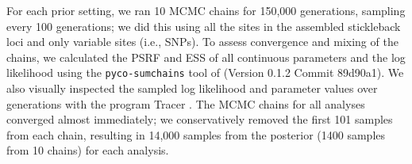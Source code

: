 For each prior setting, we ran 10 MCMC chains for 150,000 generations, sampling
every 100 generations; we did this using all the sites in the assembled
stickleback loci and only variable sites (i.e., SNPs).
To assess convergence and mixing of the chains, we calculated the PSRF
\citep{Brooks1998}
and ESS \citep{Gong2014} of all continuous parameters and the log likelihood
using the \texttt{pyco-sumchains} tool of \pycoevolity (Version 0.1.2 Commit
89d90a1).
We also visually inspected the sampled log likelihood and parameter values
over generations with the program Tracer \citep[Version 1.6;][]{Tracer16}.
The MCMC chains for all analyses converged almost immediately; we
conservatively removed the first 101 samples from each chain, resulting in
14,000 samples from the posterior (1400 samples from 10 chains) for each
analysis.

